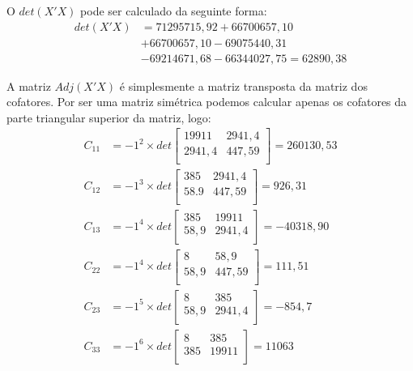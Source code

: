 \documentclass[]{ufpe-exercises}
\begin{document}
\begin{questions}
\begin{parts}
\begin{solution}
			O \(det(X'X)\) pode ser calculado da seguinte forma:
			\begin{align*}
				det(X'X) & = 71295715,92 + 66700657,10             \\
				         & + 66700657,10 - 69075440,31             \\
				         & - 69214671,68 - 66344027,75 =  62890,38
			\end{align*}

			A matriz \(Adj(X'X)\) é simplesmente a matriz transposta da matriz dos cofatores. Por ser uma matriz simétrica podemos calcular apenas os cofatores da parte triangular superior da matriz, logo:
			\begin{align*}
				C_{11} & = -1^{2} \times det
				\begin{bmatrix}
					19911  & 2941,4 \\
					2941,4 & 447,59 \\
				\end{bmatrix}
				= 260130,53
				\\
				C_{12} & = -1^{3} \times det
				\begin{bmatrix}
					385  & 2941,4 \\
					58.9 & 447,59 \\
				\end{bmatrix}
				= 926,31
				\\
				C_{13} & = -1^{4} \times det
				\begin{bmatrix}
					385  & 19911  \\
					58,9 & 2941,4 \\
				\end{bmatrix}
				= -40318,90
				\\
				C_{22} & = -1^{4} \times det
				\begin{bmatrix}
					8    & 58,9   \\
					58,9 & 447,59 \\
				\end{bmatrix}
				= 111,51
				\\
				C_{23} & = -1^{5} \times det
				\begin{bmatrix}
					8    & 385    \\
					58,9 & 2941,4 \\
				\end{bmatrix}
				= -854,7
				\\
				C_{33} & = -1^{6} \times det
				\begin{bmatrix}
					8   & 385   \\
					385 & 19911 \\
				\end{bmatrix}
				= 11063
			\end{align*}


\end{solution}
\end{parts}
\end{questions}
\end{document}

